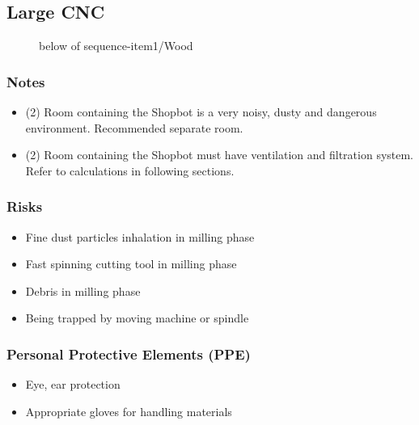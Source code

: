 \documentclass[a4paper,12pt,titlepage]{article}
\begin{document}
\subsection{Large CNC}
\begin{figure}[h]

\centering
{}
{below of sequence-item1/{Wood}}
\vspace{1cm}
\end{figure}
\subsubsection*{Notes}
\begin{itemize}
\item (2) Room containing the Shopbot is a very noisy, dusty and dangerous environment. Recommended separate room.
\item (2) Room containing the Shopbot must have ventilation and filtration system. Refer to calculations in following sections.
\end{itemize}
\subsubsection*{Risks}
\begin{itemize}
\item Fine dust particles inhalation in milling phase
\item Fast spinning cutting tool in milling phase
\item Debris in milling phase
\item Being trapped by moving machine or spindle
\end{itemize}
\subsubsection*{Personal Protective Elements (PPE)}
\begin{itemize}
\item Eye, ear protection
\item Appropriate gloves for handling materials 
\end{itemize}
\end{document}
